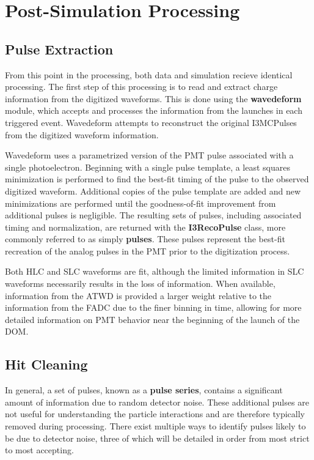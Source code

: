 \section{Post-Simulation Processing}
\subsection{Pulse Extraction}
From this point in the processing, both data and simulation recieve identical processing.
The first step of this processing is to read and extract charge information from the digitized waveforms.
This is done using the \textbf{wavedeform} module, which accepts and processes the information from the launches in each triggered event.
Wavedeform attempts to reconstruct the original I3MCPulses from the digitized waveform information.

Wavedeform uses a parametrized version of the PMT pulse associated with a single photoelectron. 
Beginning with a single pulse template, a least squares minimization is performed to find the best-fit timing of the pulse to the observed digitized waveform.
Additional copies of the pulse template are added and new minimizations are performed until the goodness-of-fit improvement from additional pulses is negligible.
The resulting sets of pulses, including associated timing and normalization, are returned with the \textbf{I3RecoPulse} class, more commonly referred to as simply \textbf{pulses}.
These pulses represent the best-fit recreation of the analog pulses in the PMT prior to the digitization process.

Both HLC and SLC waveforms are fit, although the limited information in SLC waveforms necessarily results in the loss of information.
When available, information from the ATWD is provided a larger weight relative to the information from the FADC due to the finer binning in time, allowing for more detailed information on PMT behavior near the beginning of the launch of the DOM. 

\subsection{Hit Cleaning}
In general, a set of pulses, known as a \textbf{pulse series}, contains a significant amount of information due to random detector noise.
These additional pulses are not useful for understanding the particle interactions and are therefore typically removed during processing.
There exist multiple ways to identify pulses likely to be due to detector noise, three of which will be detailed in order from most strict to most accepting.

